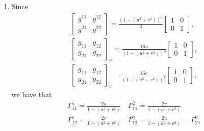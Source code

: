 \documentclass[a4paper,12pt]{article}
\theoremstyle{remark}
\begin{document}
\begin{enumerate}
\begin{enumerate}
            \item
                Since
                \begin{gather*}
                    \left[ \begin{array}{cc}
                            g^{11} & g^{12} \\
                            g^{21} & g^{22}
                    \end{array} \right]
                    = \frac{(1 - (u^2 + v^2))^2}{4}
                    \left[ \begin{array}{cc}
                            1 & 0 \\
                            0 & 1
                    \end{array} \right], \\
                    \left[ \begin{array}{cc}
                            g_{11} & g_{12} \\
                            g_{21} & g_{22}
                    \end{array} \right]_u
                    = \frac{16u}{(1 - (u^2 + v^2))^3}
                    \left[ \begin{array}{cc}
                            1 & 0 \\
                            0 & 1
                    \end{array} \right], \\
                    \left[ \begin{array}{cc}
                            g_{11} & g_{12} \\
                            g_{21} & g_{22}
                    \end{array} \right]_v
                    = \frac{16v}{(1 - (u^2 + v^2))^3}
                    \left[ \begin{array}{cc}
                            1 & 0 \\
                            0 & 1
                    \end{array} \right],
                \end{gather*}
                we have that
                \begin{gather*}
                    \Gamma_{11}^1 = \frac{2u}{1 - (u^2 + v^2)} \quad
                    \Gamma_{11}^2 = \frac{2v}{1 - (u^2 + v^2)} \\
                    \Gamma_{12}^1 = \frac{2v}{1 - (u^2 + v^2)} \quad
                    \Gamma_{12}^2 = \frac{2u}{1 - (u^2 + v^2)} = \Gamma_{21}^2 \\

\end{gather*}
\end{enumerate}
\end{enumerate}
\end{document}
